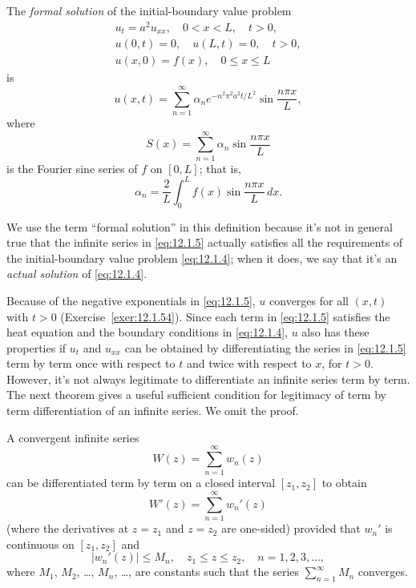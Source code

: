 \begin{definition}
  \color{blue}
  \label{thmtype:12.1.1}\rm The {\color{blue}\it formal solution\/} of the initial-boundary value
  problem
  \begin{equation}
    \label{eq:12.1.4}
    \begin{array}{c}
      u_{t}=a^{2}u_{xx},\quad0<x<L,\quad t>0, \\
      u(0,t)=0,\quad u(L,t)=0,\quad t>0,      \\
      u(x,0)=f(x),\quad0\le x\le L
    \end{array}
  \end{equation}
  is
  \begin{equation}
    \label{eq:12.1.5}u(x,t)=\sum_{n=1}^{\infty}\alpha_{n}e^{-n^{2}\pi^{2}a^{2}t/L^{2}}\sin\frac{n\pi x}{L},
  \end{equation}
  where
  \[
    S(x)=\sum_{n=1}^{\infty}\alpha_{n}\sin\frac{n\pi x}{L}
  \]
  is the Fourier sine series of $f$ on $[0,L]$; that is,
  \[
    \alpha_{n}=\frac{2}{L}\int_{0}^{L}f(x)\sin\frac{n\pi x}{L}\,dx.
  \]
\end{definition}

We use the term ``formal solution'' in this definition because it's not in general true that the
infinite series in \eqref{eq:12.1.5} actually satisfies all the requirements of the initial-boundary
value problem \eqref{eq:12.1.4}; when it does, we say that it's an {\color{blue}\it actual
solution\/} of \eqref{eq:12.1.4}.

Because of the negative exponentials in \eqref{eq:12.1.5}, $u$ converges for all $(x,t)$ with $t>0$
(Exercise~\ref{exer:12.1.54}). Since each term in \eqref{eq:12.1.5} satisfies the heat equation and
the boundary conditions in \eqref{eq:12.1.4}, $u$ also has these properties if $u_{t}$ and $u_{xx}$
can be obtained by differentiating the series in \eqref{eq:12.1.5} term by term once with respect to
$t$ and twice with respect to $x$, for $t>0$. However, it's not always legitimate to differentiate
an infinite series term by term. The next theorem gives a useful sufficient condition for legitimacy
of term by term differentiation of an infinite series. We omit the proof.

\begin{theorem}
  \color{blue}
  \label{thmtype:12.1.2} A convergent infinite series
  \[
    W(z)=\sum_{n=1}^{\infty}w_{n}(z)
  \]
  can be differentiated term by term on a closed interval $[z_{1},z_{2}]$ to obtain
  \[
    W'(z)=\sum_{n=1}^{\infty}w_{n}'(z)
  \]
  (where the derivatives at $z=z_{1}$ and $z=z_{2}$ are one-sided) provided that $w_{n}'$ is
  continuous on $[z_{1},z_{2}]$ and
  \[
    |w_{n}'(z)|\le M_{n},\quad z_{1}\le z\le z_{2},\quad n=1,2,3,\dots,
  \]
  where $M_{1}$, $M_{2}$, \dots, $M_{n}$, \dots, are constants such that the series
  $\sum_{n=1}^{\infty}M_{n}$ converges.
\end{theorem}


